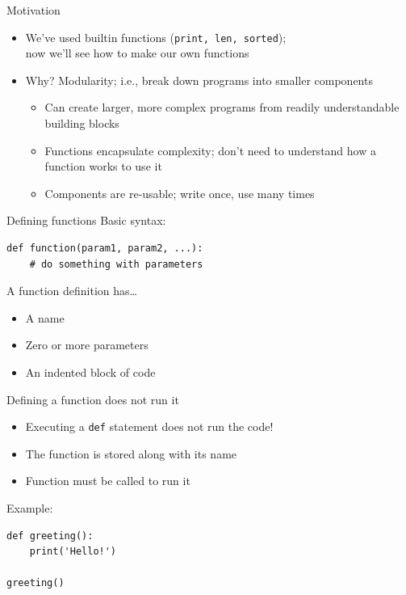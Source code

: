 \documentclass[aspectratio=169,usenames,dvipsnames]{beamer}
\begin{document}
\begin{frame}{Motivation}
    \begin{itemize}
        \item We've used builtin functions (\texttt{print, len, sorted});\\
            now we'll see how to make our own functions
        \item Why? Modularity; i.e., break down programs into smaller components
            \begin{itemize}
                \item Can create larger, more complex programs
                    from readily understandable building blocks
                \item Functions encapsulate complexity;
                    don't need to understand how a function works to use it
                \item Components are re-usable;
                    write once, use many times
            \end{itemize}
    \end{itemize}
\end{frame}

\begin{frame}[fragile]{Defining functions}
Basic syntax:
\begin{lstlisting}
def function(param1, param2, ...):
    # do something with parameters
\end{lstlisting}

    A function definition has\dots
    \begin{itemize}
        \item A name
        \item Zero or more parameters
        \item An indented block of code
    \end{itemize}
\end{frame}

\begin{frame}[fragile]{Defining a function does not run it}
    \begin{itemize}
        \item Executing a \texttt{def} statement does not run the code!
        \item The function is stored along with its name
        \item Function must be called to run it
    \end{itemize}
    Example:
\begin{lstlisting}
def greeting():
    print('Hello!')

greeting()
\end{lstlisting}
\end{frame}
\end{document}
